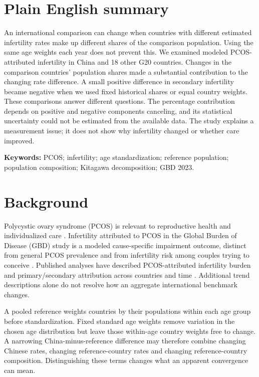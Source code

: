 \documentclass[11pt,a4paper]{article}
\begin{document}
\section*{Plain English summary}
An international comparison can change when countries with different estimated infertility rates make up different shares of the comparison population. Using the same age weights each year does not prevent this. We examined modeled PCOS-attributed infertility in China and 18 other G20 countries. Changes in the comparison countries' population shares made a substantial contribution to the changing rate difference. A small positive difference in secondary infertility became negative when we used fixed historical shares or equal country weights. These comparisons answer different questions. The percentage contribution depends on positive and negative components canceling, and its statistical uncertainty could not be estimated from the available data. The study explains a measurement issue; it does not show why infertility changed or whether care improved.

\textbf{Keywords:} PCOS; infertility; age standardization; reference population; population composition; Kitagawa decomposition; GBD 2023.

\section{Background}
Polycystic ovary syndrome (PCOS) is relevant to reproductive health and individualized care \cite{pcos}. Infertility attributed to PCOS in the Global Burden of Disease (GBD) study is a modeled cause-specific impairment outcome, distinct from general PCOS prevalence and from infertility risk among couples trying to conceive \cite{gbd}. Published analyses have described PCOS-attributed infertility burden and primary/secondary attribution across countries and time \cite{liu_pcos2024,xu}. Additional trend descriptions alone do not resolve how an aggregate international benchmark changes.

A pooled reference weights countries by their populations within each age group before standardization. Fixed standard age weights remove variation in the chosen age distribution but leave those within-age country weights free to change. A narrowing China-minus-reference difference may therefore combine changing Chinese rates, changing reference-country rates and changing reference-country composition. Distinguishing these terms changes what an apparent convergence can mean.
\end{document}
